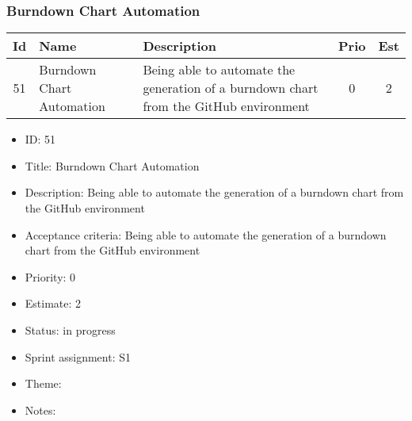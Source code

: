 \newpage
\subsubsection{Burndown Chart Automation}
\begin{tabular}{|c|m{1.5cm}|m{4cm}|c|c|}
	\hline
	\textbf{Id}&\textbf{Name}&\textbf{Description}&\textbf{Prio}&\textbf{Est}\\
	\hline
	51 & Burndown Chart Automation & 
	Being able to automate the generation of a burndown chart from the GitHub environment &
	0 & 2 \\
	\hline
\end{tabular}
\begin{itemize}
	\item ID: 51
	\item Title: Burndown Chart Automation
	\item Description: Being able to automate the generation of a burndown chart from the GitHub environment
	\item Acceptance criteria: Being able to automate the generation of a burndown chart from the GitHub environment
	\item Priority: 0
	\item Estimate: 2
	\item Status: in progress
	\item Sprint assignment: S1
	\item Theme: 
	\item Notes:
\end{itemize}

